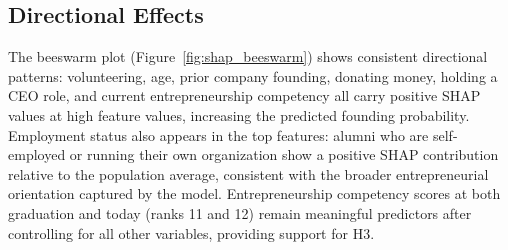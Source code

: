 \documentclass[10pt,twocolumn]{article}
\begin{document}
\begin{table}[H]
\centering
\caption{Top 15 features by mean $|\text{SHAP}|$ (Gradient Boosting, test set $n = 5{,}072$).}
\label{tab:shap}
\end{table}

\subsection{Directional Effects}

The beeswarm plot (Figure~\ref{fig:shap_beeswarm}) shows consistent directional patterns: volunteering, age, prior company founding, donating money, holding a CEO role, and current entrepreneurship competency all carry positive SHAP values at high feature values, increasing the predicted founding probability. Employment status also appears in the top features: alumni who are self-employed or running their own organization show a positive SHAP contribution relative to the population average, consistent with the broader entrepreneurial orientation captured by the model. Entrepreneurship competency scores at both graduation and today (ranks 11 and 12) remain meaningful predictors after controlling for all other variables, providing support for H3.
\end{document}
